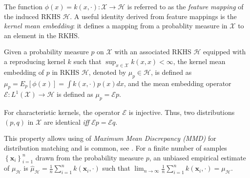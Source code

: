 The function $\phi(x) = k(x, \cdot) : \mathcal{X} \to \mathcal{H}$ is referred to as the \textit{feature mapping} of the induced RKHS $\mathcal{H}$. A useful identity derived from feature mappings is the {\it kernel mean embedding}: it defines a mapping from a probablity measure in $\mathcal{X}$ to an element in the RKHS.

\begin{definition}
\label{def:me}
Given a probability measure $p$ on $\mathcal{X}$ with an associated RKHS $\mathcal{H}$ equipped with
a reproducing kernel $k$ such that $\sup_{x \in \mathcal{X}} k(x, x) < \infty$, the kernel mean embedding of $p$ in RKHS $\mathcal{H}$, denoted by $\mu_{p} \in \mathcal{H}$, is defined as $\mu_{p} = E_p[\phi(x)]= \int k(x, \cdot) p(x)dx$, and the mean embedding operator $\mathcal{E}: L^1(\mathcal{X}) \to \mathcal{H}$ is defined as $\mu_p = \mathcal{E}p$. 
\end{definition}

\begin{tcolorbox}[bottom=0mm,top=0mm]
\begin{remark}
For characteristic kernels, the operator $\mathcal{E}$ is injective. Thus, two distributions $(p, q)$ in $\mathcal{X}$ are identical \textit{iff} $\mathcal{E}p = \mathcal{E}q$.
\end{remark}
\end{tcolorbox}
 This property allows using of  
{\it Maximum Mean Discrepancy (MMD)}
for distribution matching \citep{gretton2012kernel, li2017mmdgan} and is 
common, see \citep{Muandet2017kernel,zhou2018pnas}. For a finite number of
samples $\left\{\mathbf{x}_i\right\}_{i=1}^n$ drawn from the probability measure $p$,
an unbiased empirical estimate of $\mu_{\mathcal{H}}$ is $\hat{\mu}_{\mathcal{H}} = \tfrac{1}{n} \sum_{i=1}^{n}k(\mathbf{x}_i, \cdot)$ such that $\lim_{n \to \infty} \tfrac{1}{n} \sum_{i=1}^{n}k(\mathbf{x}_i, \cdot) = \mu_{\mathcal{H}}$.

